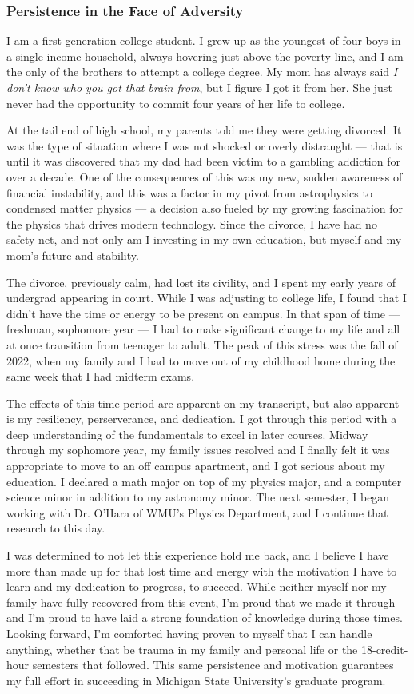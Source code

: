 \documentclass[11pt]{article}
\newcommand{\school}{Michigan State University}
\begin{document}
\subsubsection*{Persistence in the Face of Adversity}
I am a first generation college student. I grew up as the youngest of four boys in a single income household, always hovering just above the poverty line, and I am the only of the brothers to attempt a college degree. My mom has always said \textit{I don't know who you got that brain from}, but I figure I got it from her. She just never had the opportunity to commit four years of her life to college.

At the tail end of high school, my parents told me they were getting divorced. It was the type of situation where I was not shocked or overly distraught --- that is until it was discovered that my dad had been victim to a gambling addiction for over a decade. One of the consequences of this was my new, sudden awareness of financial instability, and this was a factor in my pivot from astrophysics to condensed matter physics --- a decision also fueled by my growing fascination for the physics that drives modern technology. Since the divorce, I have had no safety net, and not only am I investing in my own education, but myself and my mom's future and stability.

The divorce, previously calm, had lost its civility, and I spent my early years of undergrad appearing in court. While I was adjusting to college life, I found that I didn't have the time or energy to be present on campus. In that span of time --- freshman, sophomore year --- I had to make significant change to my life and all at once transition from teenager to adult. The peak of this stress was the fall of 2022, when my family and I had to move out of my childhood home during the same week that I had midterm exams.

The effects of this time period are apparent on my transcript, but also apparent is my resiliency, perserverance, and dedication. I got through this period with a deep understanding of the fundamentals to excel in later courses. Midway through my sophomore year, my family issues resolved and I finally felt it was appropriate to move to an off campus apartment, and I got serious about my education. I declared a math major on top of my physics major, and a computer science minor in addition to my astronomy minor. The next semester, I began working with Dr. O'Hara of WMU's Physics Department, and I continue that research to this day.

I was determined to not let this experience hold me back, and I believe I have more than made up for that lost time and energy with the motivation I have to learn and my dedication to progress, to succeed. While neither myself nor my family have fully recovered from this event, I'm proud that we made it through and I'm proud to have laid a strong foundation of knowledge during those times. Looking forward, I'm comforted having proven to myself that I can handle anything, whether that be trauma in my family and personal life or the 18-credit-hour semesters that followed. This same persistence and motivation guarantees my full effort in succeeding in \school{}'s graduate program.
\end{document}
